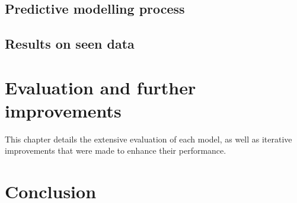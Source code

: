 \documentclass[12pt]{report}
\begin{document}
\section{Predictive modelling process}

\section{Results on seen data}

\chapter{Evaluation and further improvements}
This chapter details the extensive evaluation of each model, as well as iterative improvements 
that were made to enhance their performance.


\chapter{Conclusion}




\end{document}
